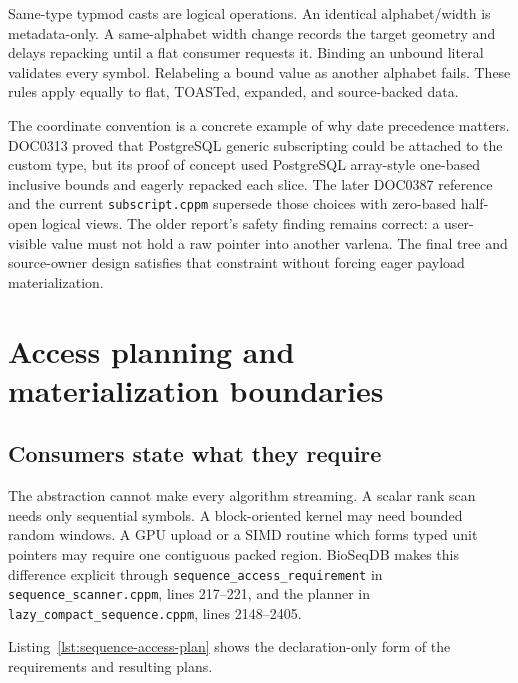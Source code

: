 Same-type typmod casts are logical operations.  An identical alphabet/width
is metadata-only.  A same-alphabet width change records the target geometry and
delays repacking until a flat consumer requests it.  Binding an unbound
literal validates every symbol.  Relabeling a bound value as another alphabet
fails.  These rules apply equally to flat, TOASTed, expanded, and
source-backed data.

The coordinate convention is a concrete example of why date precedence
matters.  DOC0313 proved that PostgreSQL generic subscripting could be attached
to the custom type, but its proof of concept used PostgreSQL array-style
one-based inclusive bounds and eagerly repacked each slice.  The later
DOC0387 reference and the current \texttt{subscript.cppm} supersede those
choices with zero-based half-open logical views.  The older report's safety
finding remains correct: a user-visible value must not hold a raw pointer into
another varlena.  The final tree and source-owner design satisfies that
constraint without forcing eager payload materialization.

\section{Access planning and materialization boundaries}
\label{sec:sequence-materialization}

\subsection{Consumers state what they require}

The abstraction cannot make every algorithm streaming.  A scalar rank scan
needs only sequential symbols.  A block-oriented kernel may need bounded
random windows.  A GPU upload or a SIMD routine which forms typed unit pointers
may require one contiguous packed region.  \mbox{BioSeqDB} makes this difference
explicit through \texttt{sequence\_access\_requirement} in
\texttt{sequence\_scanner.cppm}, lines 217--221, and the planner in
\texttt{lazy\_compact\_sequence.cppm}, lines 2148--2405.

Listing~\ref{lst:sequence-access-plan} shows the declaration-only form of the
requirements and resulting plans.

